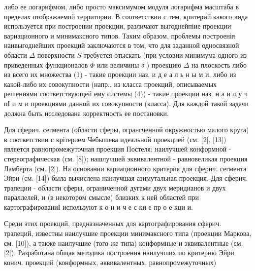 \documentclass[10pt]{article}
\begin{document}
либо ее логарифмом, либо просто максимумом модуля логарифма масштаба в пределах отображаемой территории. В соответствии с тем, критерий какого вида используется при построении проекции, различают выгоднейпіие проекции вариационного и минимаксного типов. Таким образом, проблемы построенія наивыгоднейших проекций заключаются в том, что для заданной односвязной области $\Delta$ поверхности $S$ требуется отыскать (при условии минимума одного из приведенных функционалов $\Phi$ или величины $\delta$ ) проекцию $\Delta$ на плоскость либо из всего их множества (1) - такие проекции наз. и д е а л ь н ы м и, либо из какой-либо их совокупности (напр., из класса проекций, описываемых решениями соответствующей ему системы (4)) - такие проекции наз. н а и л у ч пІ и м и проекциями данной их совокупности (класса). Для каждой такой задачи должна быть исследована корректность ее постановки.



Для сферич. сегмента (области сферы, огрангченной окружностью малого круга) в соответствии с крітерием Чебышева идеальной проекцией (см. [2], [13]) является равнопромежуточная проекция Постеля; наилучшей конформной - стереографическая (см. [8]); нашлучшей эквивалентной - равновеликая проекция Ламберта (см. [2]). На основании вариационного критерия для сферич. сегмента Эйри (см. [14]) была вычислена нанлучшая азимутальная проекция. Для сферич. трапеции - области сферы, ограниченной дугами двух меридианов и двух параллелей, и (в некотором смысле) близких к ней областей при картографированиІ используют к о н и ч е с ки е пр о е кци и.



Среди этих проекций, предназначенных для картографирования сферич. трапеций, известны наилучшие проекции минимаксного типа (проекции Маркова, см. [10]), а также наилучшие (того же типа) конформные и эквивалентные (см. [2]). Разработана общая методика построения наилучших по критерию Эйри конич. проекций (конформных, әквивалентных, равнопромежуточных)
\end{document}
